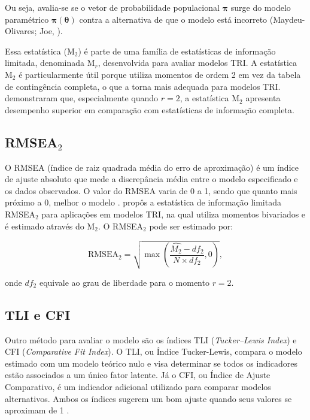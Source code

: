 Ou seja, avalia-se se o vetor de probabilidade populacional $\boldsymbol{\pi}$ surge do modelo paramétrico $\boldsymbol{\pi}(\boldsymbol{\theta})$ contra a alternativa de que o modelo está incorreto (Maydeu-Olivares; Joe, \citeyear{maydeu2006limited}).

Essa estatística (M$_2$) é parte de uma família de estatísticas de informação limitada, denominada M$_r$, desenvolvida para avaliar modelos TRI. A estatística M$_2$ é particularmente útil porque utiliza momentos de ordem 2 em vez da tabela de contingência completa, o que a torna mais adequada para modelos TRI.  demonstraram que, especialmente quando $r=2$, a estatística M$_2$ apresenta desempenho superior em comparação com estatísticas de informação completa. 

\subsection{RMSEA$_2$}

O RMSEA (índice de raiz quadrada média do erro de aproximação) é um índice de ajuste absoluto que mede a discrepância média entre o modelo especificado e os dados observados. O valor do RMSEA varia de 0 a 1, sendo que quanto mais próximo a 0, melhor o modelo \cite{kline2016principles}.  propôs a estatística de informação limitada RMSEA$_{2}$ para aplicações em modelos TRI, na qual utiliza momentos bivariados e é estimado através do M$_2$. O RMSEA$_2$ pode ser estimado por:

\[
\text{RMSEA}_2 = \sqrt{\max\left(\frac{\hat{M_{2}} - df_{2}}
	{N \times df_{2}}, 0 \right) } ,
\]

\noindent onde $df_2$ equivale ao grau de liberdade para o momento $r = 2$.

\subsection{TLI e CFI}

Outro método para avaliar o modelo são os índices TLI (\textit{Tucker–Lewis Index}) e CFI (\textit{Comparative Fit Index}). O TLI, ou Índice Tucker-Lewis, compara o modelo estimado com um modelo teórico nulo e visa determinar se todos os indicadores estão associados a um único fator latente. Já o CFI, ou Índice de Ajuste Comparativo, é um indicador adicional utilizado para comparar modelos alternativos. Ambos os índices sugerem um bom ajuste quando seus valores se aproximam de 1 \cite{hair2009multivariada}.







